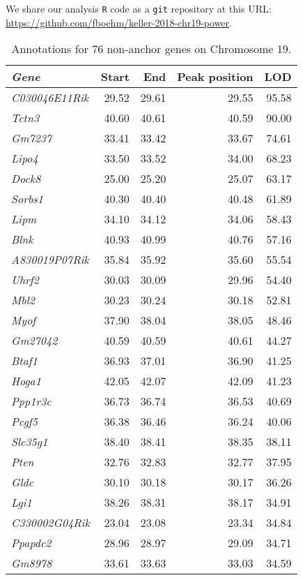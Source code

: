 \documentclass{book}
\begin{document}
We share our analysis \texttt{R} code \citep{r} as a \texttt{git} repository at this URL: \url{https://github.com/fboehm/keller-2018-chr19-power}.

\begin{table}[ht]
\caption{Annotations for 76 non-anchor genes on Chromosome 19.}\label{tab:ann76}
\centering
\begingroup\tiny
\begin{tabular}{>{\em}lrrrr}
  \hline
Gene & Start & End & Peak position & LOD \\
  \hline
C030046E11Rik & 29.52 & 29.61 & 29.55 & 95.58 \\
  Tctn3 & 40.60 & 40.61 & 40.59 & 90.00 \\
  Gm7237 & 33.41 & 33.42 & 33.67 & 74.61 \\
  Lipo4 & 33.50 & 33.52 & 34.00 & 68.23 \\
  Dock8 & 25.00 & 25.20 & 25.07 & 63.17 \\
  Sorbs1 & 40.30 & 40.40 & 40.48 & 61.89 \\
  Lipm & 34.10 & 34.12 & 34.06 & 58.43 \\
  Blnk & 40.93 & 40.99 & 40.76 & 57.16 \\
  A830019P07Rik & 35.84 & 35.92 & 35.60 & 55.54 \\
  Uhrf2 & 30.03 & 30.09 & 29.96 & 54.40 \\
  Mbl2 & 30.23 & 30.24 & 30.18 & 52.81 \\
  Myof & 37.90 & 38.04 & 38.05 & 48.46 \\
  Gm27042 & 40.59 & 40.59 & 40.61 & 44.27 \\
  Btaf1 & 36.93 & 37.01 & 36.90 & 41.25 \\
  Hoga1 & 42.05 & 42.07 & 42.09 & 41.23 \\
  Ppp1r3c & 36.73 & 36.74 & 36.53 & 40.69 \\
  Pcgf5 & 36.38 & 36.46 & 36.24 & 40.06 \\
  Slc35g1 & 38.40 & 38.41 & 38.35 & 38.11 \\
  Pten & 32.76 & 32.83 & 32.77 & 37.95 \\
  Gldc & 30.10 & 30.18 & 30.17 & 36.26 \\
  Lgi1 & 38.26 & 38.31 & 38.17 & 34.91 \\
  C330002G04Rik & 23.04 & 23.08 & 23.34 & 34.84 \\
  Ppapdc2 & 28.96 & 28.97 & 29.09 & 34.71 \\
  Gm8978 & 33.61 & 33.63 & 33.03 & 34.59 \\

\end{tabular}
\end{table}
\end{document}
